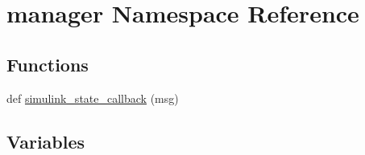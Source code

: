 \hypertarget{namespacemanager}{}\section{manager Namespace Reference}
\label{namespacemanager}
\subsection*{Functions}
\begin{DoxyCompactItemize}
\item 
def \hyperlink{namespacemanager_ae7c336047eda26124f4453e77f436139}{simulink\+\_\+state\+\_\+callback} (msg)
\end{DoxyCompactItemize}
\subsection*{Variables}
